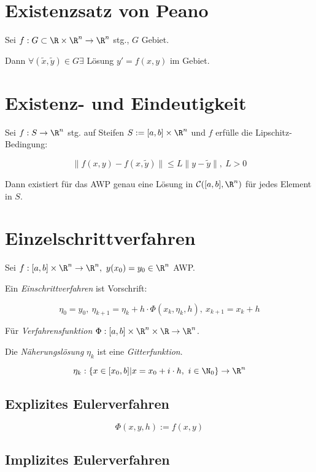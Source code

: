 \section*{Existenzsatz von Peano}

Sei $f : G \subset \R \times \R^n \to \R^n$ stg., $G$ Gebiet.

Dann $\forall (\tilde x,\tilde y) \in G \exists$ Lösung $y'=f(x,y)$ im Gebiet.

\section*{Existenz- und Eindeutigkeit}

Sei $f : S \to \R^n$ stg. auf Steifen $S := [a,b] \times \R^n$ und $f$ erfülle die Lipschitz-Bedingung:

\vspace*{-2mm}
$$\|f(x,y)-f(x,\tilde y)\| \leq L \|y-\tilde y\|, \ L > 0$$

Dann existiert für das AWP genau eine Lösung in $\mathcal{C}([a,b],\R^n)$ für jedes Element in $S$.

\section*{Einzelschrittverfahren}

Sei $f : [a,b] \times \R^n \to \R^n, \ y(x_0)=y_0 \in \R^n$ AWP.

Ein \emph{Einschrittverfahren} ist Vorschrift:

\vspace*{-4mm}
$$\eta_0 = y_0, \ \eta_{k+1} = \eta_k + h \cdot \Phi(x_k, \eta_k, h), \ x_{k+1} = x_k + h$$

Für \emph{Verfahrensfunktion} $\Phi : [a,b] \times \R^n \times \R \to \R^n$.

\spacing

Die \emph{Näherungslösung} $\eta_k$ ist eine \emph{Gitterfunktion}.

\vspace*{-4mm}
$$\eta_k : \{x \in [x_0,b] | x = x_0 + i \cdot h, \ i \in \N_0 \} \to \R^n$$

\subsection*{Explizites Eulerverfahren}

$$\Phi(x,y,h) := f(x,y)$$

\subsection*{Implizites Eulerverfahren}

